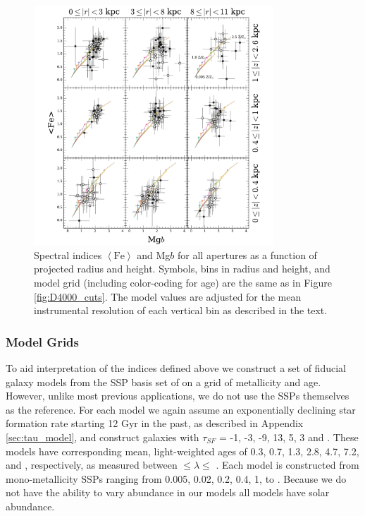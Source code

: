 \begin{figure}[t]
  \centering
  \includegraphics[width=0.8\textwidth]{891_1/figs/Mgb_multires.pdf}
  \caption{\label{fig:Mgb_cuts}\fixspacing Spectral indices
    $\left<\mathrm{Fe}\right>$ and Mg$b$ for all apertures as a
    function of projected radius and height. Symbols, bins in radius
    and height, and model grid (including color-coding for age) are
    the same as in Figure \ref{fig:D4000_cuts}. The model values are
    adjusted for the mean instrumental resolution of each vertical bin
    as described in the text.}
\end{figure}



\subsubsection{Model Grids}
\label{sec:fidgrid}

To aid interpretation of the indices defined above we construct a set
of fiducial galaxy models from the SSP basis set of \citet{Bruzual03}
on a grid of metallicity and age. However, unlike most previous
applications, we do not use the SSPs themselves as the reference. For
each model we again assume an exponentially declining star formation
rate starting 12 Gyr in the past, as described in Appendix
\ref{sec:tau_model}, and construct galaxies with $\tau_{SF}$ = -1, -3,
-9, 13, 5, 3 and . These models have corresponding mean,
light-weighted ages of 0.3, 0.7, 1.3, 2.8, 4.7, 7.2, and
, respectively, as measured between 
$\leq\lambda\leq$ . Each model is constructed from
mono-metallicity SSPs ranging from 0.005, 0.02, 0.2, 0.4, 1, to
. Because we do not have the ability to vary abundance
in our models \citep[as done, for example, by][]{Trager08} all models
have solar abundance. 

